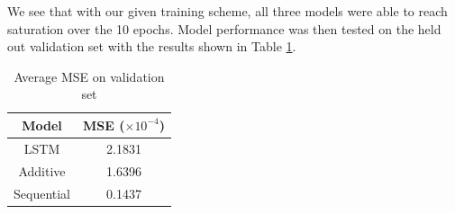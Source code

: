 We see that with our given training scheme, all three models were able to reach saturation over the 10 epochs. Model performance was then tested on the held out validation set with the results shown in Table \ref{tab:results_summary}.

\begin{table}[H]
	\centering
	\begin{tabular}{|c|c|}
	\hline
	Model & MSE ($\times 10^{-4}$) \\
	\hline
	LSTM & 2.1831 \\
	Additive & 1.6396 \\
	Sequential & 0.1437 \\
	\hline
	\end{tabular}
	\caption{Average MSE on validation set}
	\label{tab:results_summary}
\end{table}